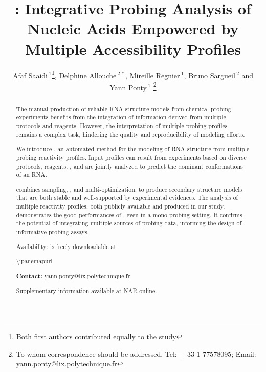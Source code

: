 \documentclass[a4,center,fleqn]{NAR}
\begin{document}
\title{\OurTool{}:  Integrative Probing Analysis of Nucleic Acids Empowered by Multiple Accessibility Profiles}
\author{%
Afaf Saaidi\,$^{1}$\footnote{Both first authors contributed equally to the study},
Delphine Allouche\,$^{2\,*}$,
Mireille Regnier\,$^{1}$,
Bruno Sargueil\,$^{2}$
and Yann Ponty\,$^1$%
\footnote{To whom correspondence should be addressed.
Tel: + 33 1 77578095; Email: yann.ponty@lix.polytechnique.fr}}


\address{%
$^{1}$\,CNRS UMR 7161, LIX, Ecole Polytechnique, 1 rue Estienne d'Orves, 91120 Palaiseau, France
and
$^{2}$\,CNRS UMR 8038, CitCoM, Universit\'e de Paris, 4 avenue de l'observatoire, 75006 Paris, France}


\maketitle
\begin{abstract}
The manual production of reliable RNA structure models from chemical probing experiments benefits from the integration of information derived from multiple protocols and reagents. However, the interpretation of multiple probing profiles remains a complex task, hindering the quality and reproducibility of modeling efforts.

\noindent We introduce \OurTool{}, an automated method for the modeling of RNA structure from multiple probing reactivity profiles. Input profiles can result from experiments based on diverse protocols, reagents, , and are jointly analyzed to predict the dominant conformations of an RNA.

\noindent \OurTool{} combines sampling, , and multi-optimization, to produce secondary structure models that are both stable and well-supported by experimental evidences. The analysis of multiple reactivity profiles, both publicly available and produced in our study, demonstrates the good performances of \OurTool, even in a mono probing setting. It confirms the potential of integrating multiple sources of probing data, informing the design of informative probing assays. 

\noindent Availability: \OurTool{} is freely downloadable at

{\centering \url{\ipanemapurl}\\[.5em]}

\noindent \textbf{Contact:} \href{yann.ponty@lix.polytechnique.fr}{yann.ponty@lix.polytechnique.fr}

\noindent Supplementary information available at NAR online.
\end{abstract}
\end{document}
